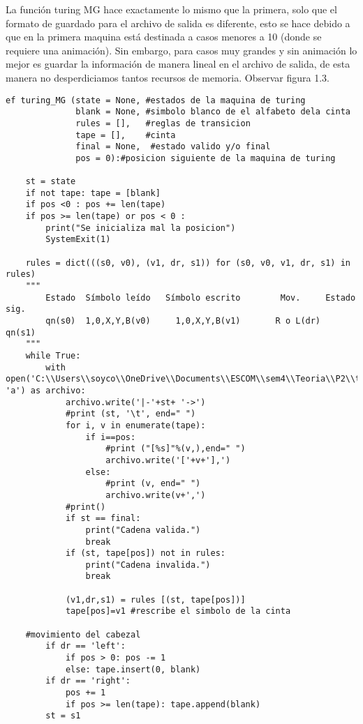 La función turing MG hace exactamente lo mismo que la primera, solo que el formato de guardado para el archivo de salida es diferente, esto se hace debido a que en la primera maquina está destinada a casos menores a 10 (donde se requiere una animación). Sin embargo, para casos muy grandes y sin animación lo mejor es guardar la información de manera lineal en el archivo de salida, de esta manera no desperdiciamos tantos recursos de memoria. Observar figura 1.3.\newline


\begin{lstlisting}
ef turing_MG (state = None, #estados de la maquina de turing
              blank = None, #simbolo blanco de el alfabeto dela cinta
              rules = [],   #reglas de transicion
              tape = [],    #cinta
              final = None,  #estado valido y/o final
              pos = 0):#posicion siguiente de la maquina de turing

    st = state
    if not tape: tape = [blank]
    if pos <0 : pos += len(tape)
    if pos >= len(tape) or pos < 0 : 
        print("Se inicializa mal la posicion")
        SystemExit(1)
    
    rules = dict(((s0, v0), (v1, dr, s1)) for (s0, v0, v1, dr, s1) in rules)
    """
        Estado	Símbolo leído	Símbolo escrito	       Mov. 	Estado sig.
        qn(s0)  1,0,X,Y,B(v0)	  1,0,X,Y,B(v1)       R o L(dr)	   qn(s1)
    """
    while True:
        with open('C:\\Users\\soyco\\OneDrive\\Documents\\ESCOM\\sem4\\Teoria\\P2\\turing\\output\\turing.txt', 'a') as archivo:
            archivo.write('|-'+st+ '->')
            #print (st, '\t', end=" ")
            for i, v in enumerate(tape):
                if i==pos: 
                    #print ("[%s]"%(v,),end=" ")
                    archivo.write('['+v+'],')
                else: 
                    #print (v, end=" ")
                    archivo.write(v+',') 
            #print()
            if st == final: 
                print("Cadena valida.")
                break
            if (st, tape[pos]) not in rules: 
                print("Cadena invalida.")
                break
            
            (v1,dr,s1) = rules [(st, tape[pos])]
            tape[pos]=v1 #rescribe el simbolo de la cinta
    
    #movimiento del cabezal
        if dr == 'left':
            if pos > 0: pos -= 1
            else: tape.insert(0, blank)
        if dr == 'right':
            pos += 1
            if pos >= len(tape): tape.append(blank)
        st = s1

\end{lstlisting}
